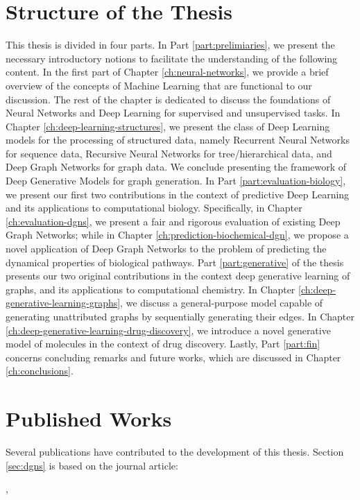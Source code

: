 \section{Structure of the Thesis}
This thesis is divided in four parts. In Part \ref{part:prelimiaries}, we present the necessary introductory notions to facilitate the understanding of the following content. In the first part of Chapter \ref{ch:neural-networks}, we provide a brief overview of the concepts of Machine Learning that are functional to our discussion. The rest of the chapter is dedicated to discuss the foundations of Neural Networks and Deep Learning for supervised and unsupervised tasks. In Chapter \ref{ch:deep-learning-structures}, we present the class of Deep Learning models for the processing of structured data, namely Recurrent Neural Networks for sequence data, Recursive Neural Networks for tree/hierarchical data, and Deep Graph Networks for graph data. We conclude presenting the framework of Deep Generative Models for graph generation. In Part \ref{part:evaluation-biology}, we present our first two contributions in the context of predictive Deep Learning and its applications to computational biology. Specifically, in Chapter \ref{ch:evaluation-dgns}, we present a fair and rigorous evaluation of existing Deep Graph Networks; while in Chapter \ref{ch:prediction-biochemical-dgn}, we propose a novel application of Deep Graph Networks to the problem of predicting the dynamical properties of biological pathways. Part \ref{part:generative} of the thesis presents our two original contributions in the context deep generative learning of graphs, and its applications to computational chemistry. In Chapter \ref{ch:deep-generative-learning-graphs}, we discuss a general-purpose  model capable of generating unattributed graphs by sequentially generating their edges. In Chapter \ref{ch:deep-generative-learning-drug-discovery}, we introduce a novel generative model of molecules in the context of drug discovery. Lastly, Part \ref{part:fin} concerns concluding remarks and future works, which are discussed in Chapter \ref{ch:conclusions}.

\section{Published Works}
Several publications have contributed to the development of this thesis. Section \ref{sec:dgns} is based on the journal article:

\vspace{1em}
,
\vspace{1em}

